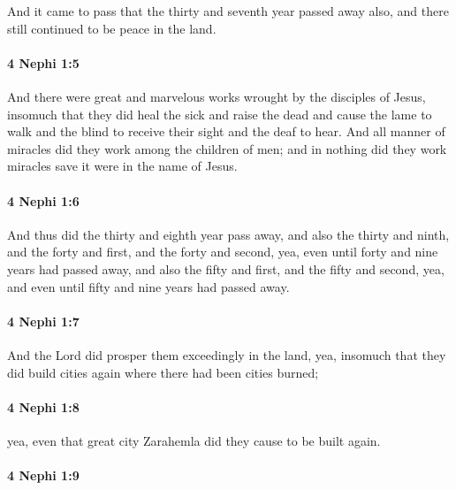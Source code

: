 			And it came to pass that the thirty and seventh year passed away also,
			and there still continued to be peace in the land.

		\paragraph{4 Nephi 1:5} %
			\label{4NEPHI-1-5}

			And there were great and marvelous works wrought by the disciples of Jesus,
			insomuch that they did heal the sick and raise the dead
			and cause the lame to walk and the blind to receive their sight and the deaf to hear.
			And all manner of miracles did they work among the children of men;
			and in nothing did they work miracles save it were in the name of Jesus.

		\paragraph{4 Nephi 1:6} %
			\label{4NEPHI-1-6}

			And thus did the thirty and eighth year pass away,
			and also the thirty and ninth,
			and the forty and first,
			and the forty and second,
			yea, even until forty and nine years had passed away,
			and also the fifty and first,
			and the fifty and second,
			yea, and even until fifty and nine years had passed away.

		\paragraph{4 Nephi 1:7} %
			\label{4NEPHI-1-7}

			And the Lord did prosper them exceedingly in the land,
			yea, insomuch that they did build cities again
			where there had been cities burned;

		\paragraph{4 Nephi 1:8} %
			\label{4NEPHI-1-8}

			yea, even that great city Zarahemla did they cause to be built again.

		\paragraph{4 Nephi 1:9} %
			\label{4NEPHI-1-9}

